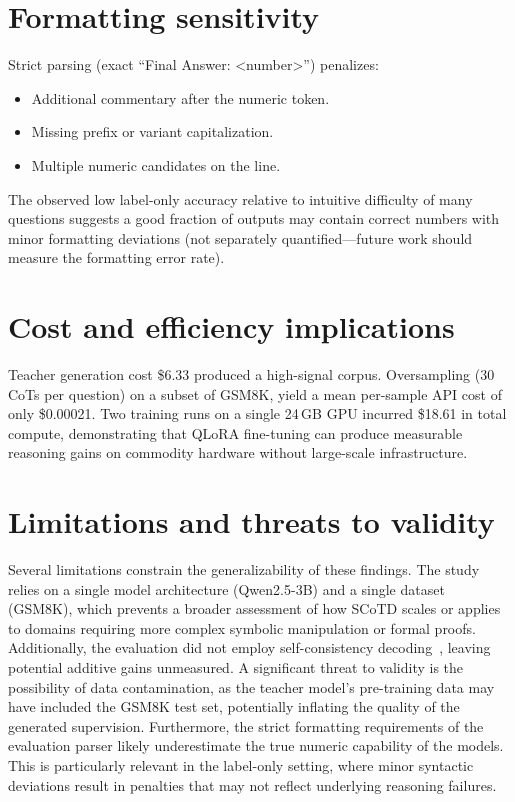 \section{Formatting sensitivity}
Strict parsing (exact ``Final Answer: <number>'') penalizes:
\begin{itemize}
    \item Additional commentary after the numeric token.
    \item Missing prefix or variant capitalization.
    \item Multiple numeric candidates on the line.
\end{itemize}
The observed low label-only accuracy relative to intuitive difficulty of many questions suggests a good fraction of outputs may contain correct numbers with minor formatting deviations (not separately quantified—future work should measure the formatting error rate).

\section{Cost and efficiency implications}
Teacher generation cost \$6.33 produced a high-signal corpus. Oversampling (30 CoTs per question) on a subset of GSM8K, yield a mean per-sample API cost of only \$0.00021. Two training runs on a single 24\,GB GPU incurred \$18.61 in total compute, demonstrating that QLoRA fine-tuning can produce measurable reasoning gains on commodity hardware without large-scale infrastructure.

\section{Limitations and threats to validity}
Several limitations constrain the generalizability of these findings. The study relies on a single model architecture (Qwen2.5-3B) and a single dataset (GSM8K), which prevents a broader assessment of how SCoTD scales or applies to domains requiring more complex symbolic manipulation or formal proofs. Additionally, the evaluation did not employ self-consistency decoding~\cite{wang2023selfconsistencyimproveschainthought}, leaving potential additive gains unmeasured. A significant threat to validity is the possibility of data contamination, as the teacher model's pre-training data may have included the GSM8K test set, potentially inflating the quality of the generated supervision. Furthermore, the strict formatting requirements of the evaluation parser likely underestimate the true numeric capability of the models. This is particularly relevant in the label-only setting, where minor syntactic deviations result in penalties that may not reflect underlying reasoning failures.

